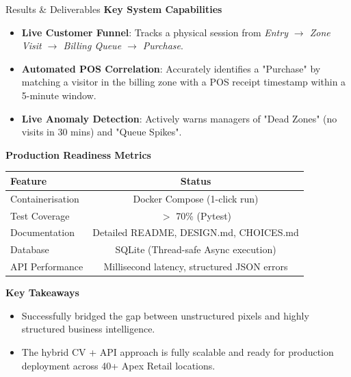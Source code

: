 \documentclass[10pt]{beamer}
\begin{document}
\begin{frame}{Results \& Deliverables}
\textbf{Key System Capabilities}
\begin{itemize}
    \item \textbf{Live Customer Funnel}: Tracks a physical session from \textit{Entry $\rightarrow$ Zone Visit $\rightarrow$ Billing Queue $\rightarrow$ Purchase}.
    \item \textbf{Automated POS Correlation}: Accurately identifies a "Purchase" by matching a visitor in the billing zone with a POS receipt timestamp within a 5-minute window.
    \item \textbf{Live Anomaly Detection}: Actively warns managers of "Dead Zones" (no visits in 30 mins) and "Queue Spikes".
\end{itemize}

\vspace{0.2cm}
\textbf{Production Readiness Metrics}
\begin{center}
\small
\begin{tabular}{lc}
\toprule
\textbf{Feature} & \textbf{Status} \\
\midrule
Containerisation & Docker Compose (1-click run) \\
Test Coverage & $>$ 70\% (Pytest) \\
Documentation & Detailed README, DESIGN.md, CHOICES.md \\
Database & SQLite (Thread-safe Async execution) \\
API Performance & Millisecond latency, structured JSON errors \\
\bottomrule
\end{tabular}
\end{center}

\vspace{0.1cm}
\textbf{Key Takeaways}
\begin{itemize}
    \item Successfully bridged the gap between unstructured pixels and highly structured business intelligence.
    \item The hybrid CV + API approach is fully scalable and ready for production deployment across 40+ Apex Retail locations.
\end{itemize}
\end{frame}
\end{document}
